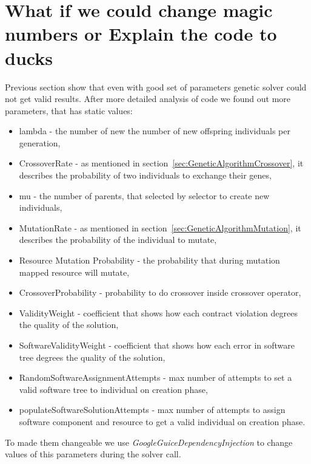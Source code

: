 \section{What if we could change magic numbers or Explain the code to ducks}
Previous section show that even with good set of parameters genetic solver could not get valid results.
After more detailed analysis of code we found out more parameters, that has static values:
\begin{itemize}
	\item lambda - the number of new the number of new offspring individuals per generation,
	\item CrossoverRate - as mentioned in section~\ref{sec:GeneticAlgorithmCrossover}, it describes the probability of two individuals to exchange their genes,
	\item mu - the number of parents, that selected by selector to create new individuals,
	\item MutationRate - as mentioned in section~\ref{sec:GeneticAlgorithmMutation}, it describes the probability of the individual to mutate,
	\item Resource Mutation Probability - the probability that during mutation mapped resource will mutate,
	\item CrossoverProbability - probability to do crossover inside crossover operator,
	\item ValidityWeight - coefficient that shows how each contract violation degrees the quality of the solution, 
	\item SoftwareValidityWeight - coefficient that shows how each error in software tree degrees the quality of the solution,
	\item RandomSoftwareAssignmentAttempts - max number of attempts to set a valid software tree to individual on creation phase,
	\item populateSoftwareSolutionAttempts -  max number of attempts to assign software component and resource to get a valid individual on creation phase.
\end{itemize}

To made them changeable we use \textit{GoogleGuiceDependencyInjection} to change values of this parameters during the solver call.


